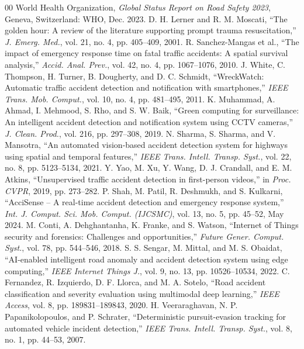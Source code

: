 \documentclass[conference]{IEEEtran}
\begin{document}
\begin{thebibliography}{00}
 World Health Organization, \textit{Global Status Report on Road Safety 2023}, Geneva, Switzerland: WHO, Dec. 2023.
 D. H. Lerner and R. M. Moscati, ``The golden hour: A review of the literature supporting prompt trauma resuscitation,'' \textit{J. Emerg. Med.}, vol. 21, no. 4, pp. 405--409, 2001.
 R. Sanchez-Mangas et al., ``The impact of emergency response time on fatal traffic accidents: A spatial survival analysis,'' \textit{Accid. Anal. Prev.}, vol. 42, no. 4, pp. 1067--1076, 2010.
 J. White, C. Thompson, H. Turner, B. Dougherty, and D. C. Schmidt, ``WreckWatch: Automatic traffic accident detection and notification with smartphones,'' \textit{IEEE Trans. Mob. Comput.}, vol. 10, no. 4, pp. 481--495, 2011.
 K. Muhammad, A. Ahmad, I. Mehmood, S. Rho, and S. W. Baik, ``Green computing for surveillance: An intelligent accident detection and notification system using CCTV cameras,'' \textit{J. Clean. Prod.}, vol. 216, pp. 297--308, 2019.
 N. Sharma, S. Sharma, and V. Mansotra, ``An automated vision-based accident detection system for highways using spatial and temporal features,'' \textit{IEEE Trans. Intell. Transp. Syst.}, vol. 22, no. 8, pp. 5123--5134, 2021.
 Y. Yao, M. Xu, Y. Wang, D. J. Crandall, and E. M. Atkins, ``Unsupervised traffic accident detection in first-person videos,'' in \textit{Proc. CVPR}, 2019, pp. 273--282.
 P. Shah, M. Patil, R. Deshmukh, and S. Kulkarni, ``AcciSense -- A real-time accident detection and emergency response system,'' \textit{Int. J. Comput. Sci. Mob. Comput. (IJCSMC)}, vol. 13, no. 5, pp. 45--52, May 2024.
 M. Conti, A. Dehghantanha, K. Franke, and S. Watson, ``Internet of Things security and forensics: Challenges and opportunities,'' \textit{Future Gener. Comput. Syst.}, vol. 78, pp. 544--546, 2018.
 S. S. Sengar, M. Mittal, and M. S. Obaidat, ``AI-enabled intelligent road anomaly and accident detection system using edge computing,'' \textit{IEEE Internet Things J.}, vol. 9, no. 13, pp. 10526--10534, 2022.
 C. Fernandez, R. Izquierdo, D. F. Llorca, and M. A. Sotelo, ``Road accident classification and severity evaluation using multimodal deep learning,'' \textit{IEEE Access}, vol. 8, pp. 189831--189843, 2020.
 H. Veeraraghavan, N. P. Papanikolopoulos, and P. Schrater, ``Deterministic pursuit-evasion tracking for automated vehicle incident detection,'' \textit{IEEE Trans. Intell. Transp. Syst.}, vol. 8, no. 1, pp. 44--53, 2007.

\end{thebibliography}
\end{document}
